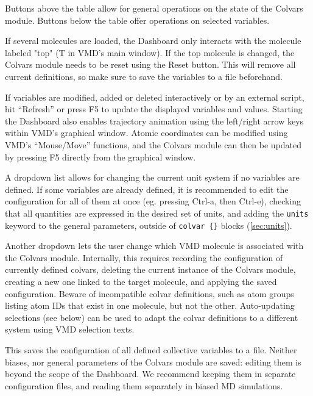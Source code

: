 {Buttons above the table allow for general operations on the state of the Colvars module.
Buttons below the table offer operations on selected variables.

If several molecules are loaded, the Dashboard only interacts with the molecule labeled "top" (T in VMD's main window).
If the top molecule is changed, the Colvars module needs to be reset using the Reset button.
This will remove all current definitions, so make sure to save the variables to a file beforehand.

If variables are modified, added or deleted interactively or by an external script, hit ``Refresh'' or press F5 to update the displayed variables and values.
Starting the Dashboard also enables trajectory animation using the left/right arrow keys within VMD's graphical window.
Atomic coordinates can be modified using VMD's ``Mouse/Move'' functions, and the Colvars module can then be updated by pressing F5 directly from the graphical window.

A dropdown list allows for changing the current unit system if no variables are defined.
If some variables are already defined, it is recommended to edit the configuration for all of
them at once (eg. pressing Ctrl-a, then Ctrl-e), checking that all quantities are expressed in the desired set of units, and adding the
\texttt{units} keyword to the general parameters, outside of \texttt{colvar \{\}} blocks (\ref{sec:units}).

Another dropdown lets the user change which VMD molecule is associated with the Colvars module.
Internally, this requires recording the configuration of currently defined colvars, deleting the current instance of the Colvars module,
creating a new one linked to the target molecule, and applying the saved configuration.
Beware of incompatible colvar definitions, such as atom groups listing atom IDs that exist in one molecule, but not the other.
Auto-updating selections (see below) can be used to adapt the colvar definitions to a different system using VMD selection texts.


This saves the configuration of all defined collective variables to a file.
Neither biases, nor general parameters of the Colvars module are saved: editing them is beyond the scope of the Dashboard.
We recommend keeping them in separate configuration files, and reading them separately in biased MD simulations.


}
